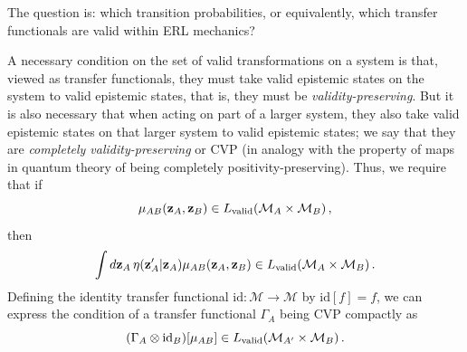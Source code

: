 \documentclass[pra,superscriptaddress,nofootinbib,12pt]{revtex4-2}
\begin{document}
The question is: which transition probabilities, or equivalently, which transfer functionals are valid within ERL mechanics?


A necessary condition on the set of valid transformations on a system is that, viewed as transfer functionals, they must take valid epistemic states on the system to valid epistemic states, that is, they must be \emph{validity-preserving}.  But it is also necessary that when acting on part of a larger system, they also take valid epistemic states on that larger system to valid epistemic states; we say that they are \emph{completely validity-preserving} or CVP (in analogy with the property of maps in quantum theory of being completely positivity-preserving).
Thus, we require that if
\begin{equation}
  \mu_{AB}(\mathbf{z}_A,\mathbf{z}_B)\in L_{\rm valid} (\mathcal{M}_A \times \mathcal{M}_B)\,,
\end{equation}
then
\begin{equation}
  \int d\mathbf{z}_A \,\eta(\mathbf{z}'_{A}|\mathbf{z}_A)\mu_{AB}(\mathbf{z}_A,\mathbf{z}_B)\in L_{\rm valid} (\mathcal{M}_{A} \times \mathcal{M}_B)\,.
\end{equation}
Defining the identity transfer functional $\mathrm{id}: \mathcal{M} \to \mathcal{M}$ by $\mathrm{id}[f]=f$, we can express the condition of a transfer functional $\Gamma_{A}$ being CVP compactly as
\begin{equation}
  (\Gamma_{A} \otimes \textrm{id}_B)[\mu_{AB}] \in L_{\rm valid}(\mathcal{M}_{A'} \times \mathcal{M}_B)\,.
\end{equation}
\end{document}
